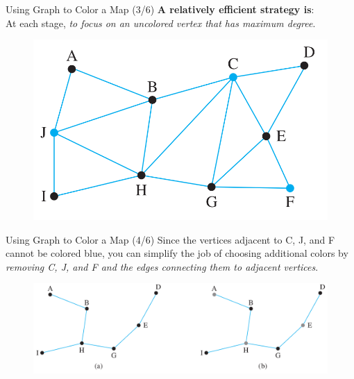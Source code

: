 \documentclass[english,t]{beamer}
\begin{document}
\begin{frame}{Using Graph to Color a Map (3/6)}
	\textbf{A relatively efficient strategy is}: \\
	At each stage, \textit{to focus on an uncolored vertex that has maximum degree}.
	\begin{figure}[!ht]
		\centering
		\includegraphics[scale=.25]{images/map-coloring-3}
	\end{figure}	
\end{frame}

\begin{frame}{Using Graph to Color a Map (4/6)}
	Since the vertices adjacent to C, J, and F cannot be colored blue, you can simplify the job of choosing additional colors by \textit{removing C, J, and F and the edges connecting them to adjacent vertices}.
	\begin{figure}[!ht]
		\centering
		\includegraphics[scale=.2]{images/map-coloring-4}
	\end{figure}	
\end{frame}
\end{document}
